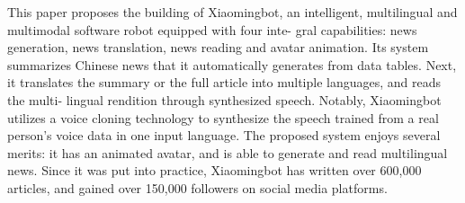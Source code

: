 This paper proposes the building of Xiaomingbot, an intelligent, multilingual and multimodal software robot equipped with four inte- gral capabilities: news generation, news translation, news reading and avatar animation. Its system summarizes Chinese news that it automatically generates from data tables. Next, it translates the summary or the full article into multiple languages, and reads the multi- lingual rendition through synthesized speech. Notably, Xiaomingbot utilizes a voice cloning technology to synthesize the speech trained from a real person's voice data in one input language. The proposed system enjoys several merits: it has an animated avatar, and is able to generate and read multilingual news. Since it was put into practice, Xiaomingbot has written over 600,000 articles, and gained over 150,000 followers on social media platforms.
